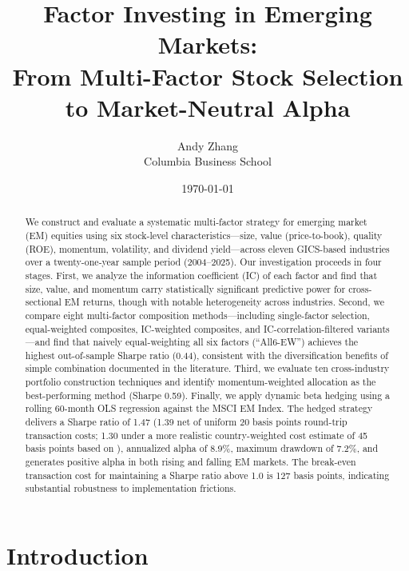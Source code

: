 \documentclass[12pt,a4paper]{article}
\title{\textbf{Factor Investing in Emerging Markets: \\
From Multi-Factor Stock Selection to Market-Neutral Alpha}}
\author{Andy Zhang \\ Columbia Business School}
\date{\today}
\begin{document}
\maketitle

\begin{abstract}
We construct and evaluate a systematic multi-factor strategy for emerging market (EM) equities using six stock-level characteristics---size, value (price-to-book), quality (ROE), momentum, volatility, and dividend yield---across eleven GICS-based industries over a twenty-one-year sample period (2004--2025). Our investigation proceeds in four stages. First, we analyze the information coefficient (IC) of each factor and find that size, value, and momentum carry statistically significant predictive power for cross-sectional EM returns, though with notable heterogeneity across industries. Second, we compare eight multi-factor composition methods---including single-factor selection, equal-weighted composites, IC-weighted composites, and IC-correlation-filtered variants---and find that naively equal-weighting all six factors (``All6-EW'') achieves the highest out-of-sample Sharpe ratio (0.44), consistent with the diversification benefits of simple combination documented in the literature. Third, we evaluate ten cross-industry portfolio construction techniques and identify momentum-weighted allocation as the best-performing method (Sharpe 0.59). Finally, we apply dynamic beta hedging using a rolling 60-month OLS regression against the MSCI EM Index. The hedged strategy delivers a Sharpe ratio of 1.47 (1.39 net of uniform 20 basis points round-trip transaction costs; 1.30 under a more realistic country-weighted cost estimate of 45 basis points based on \citet{domowitz2001}), annualized alpha of 8.9\%, maximum drawdown of 7.2\%, and generates positive alpha in both rising and falling EM markets. The break-even transaction cost for maintaining a Sharpe ratio above 1.0 is 127 basis points, indicating substantial robustness to implementation frictions.
\end{abstract}

\newpage
\tableofcontents
\newpage

\section{Introduction}
\label{sec:intro}
\end{document}
